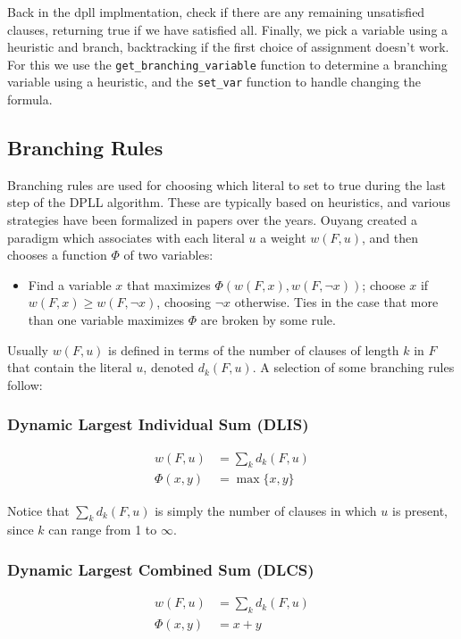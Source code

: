 \documentclass[10pt,AMS Euler]{article}
\begin{document}
Back in the dpll implmentation, check if there are any remaining unsatisfied
clauses, returning true if we have satisfied all. Finally, we pick a
variable using a heuristic and branch, backtracking if the first choice of
assignment doesn't work. For this we use the \texttt{get\_branching\_variable} function
to determine a branching variable using a heuristic, and the \texttt{set\_var}
function to handle changing the formula.

\subsection*{Branching Rules}
\label{sec:org0676d65}
Branching rules are used for choosing which literal to set to true during
the last step of the DPLL algorithm. These are typically based on heuristics,
and various strategies have been formalized in papers over the years.
Ouyang \cite{ouyang} created a paradigm which associates with each literal \(u\) a weight \(w(F, u)\),
and then chooses a function \(\Phi\) of two variables:
\begin{itemize}
\item Find a variable \(x\) that maximizes \(\Phi(w(F,x), w(F, \neg x))\); choose \(x\) if
\(w(F, x) \geq w(F,\neg x)\), choosing \(\neg x\) otherwise. Ties in the case that more
than one variable maximizes \(\Phi\) are broken by some rule.
\end{itemize}

Usually \(w(F,u)\) is defined in terms of the number of clauses of length \(k\) in \(F\) that contain the
literal \(u\), denoted \(d_k(F, u)\). A selection of some branching rules follow:
\subsubsection*{Dynamic Largest Individual Sum (DLIS)}
\label{sec:orgf5dfc28}
\begin{align*}
w(F,u) &= \sum_k d_k(F,u) \\
\Phi(x,y) &= \max\{x,y\}
\end{align*}

Notice that \(\sum_k d_k(F,u)\) is simply the number of clauses in which \(u\) is present,
since \(k\) can range from 1 to \(\infty\).
\subsubsection*{Dynamic Largest Combined Sum (DLCS)}
\label{sec:org401045f}
\begin{align*}
w(F,u) &= \sum_k d_k(F,u) \\
\Phi(x,y) &= x + y
\end{align*}
\end{document}
